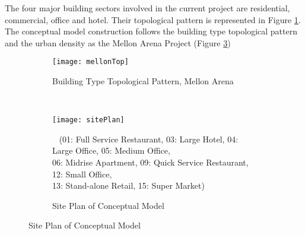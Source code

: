 \documentclass[hidelinks,12pt]{article}
\newcommand{\fref}[1]{Figure \ref{#1}}
\begin{document}
The four major building sectors involved in the current project are
residential, commercial, office and hotel. Their topological pattern
is represented in Figure \ref{fig:mellonTop}. The conceptual model
construction follows the building type topological pattern and the
urban density as the Mellon Arena Project (\fref{fig:sitePlan})
\begin{figure}[h!]
  \centering
  \begin{subfigure}
  \centering
  \texttt{[image: mellonTop]}
  \caption{Building Type Topological Pattern, Mellon Arena}
  \label{fig:mellonTop}
  \end{subfigure}
  ~
  \begin{subfigure}
  \centering
  \texttt{[image: sitePlan]}
  \caption{Site Plan of Conceptual Model}~ (01: Full Service
  Restaurant, 03: Large Hotel, 04: Large Office, 05: Medium Office,
  \\06: Midrise Apartment, 09: Quick Service Restaurant, 12: Small
  Office, \\13: Stand-alone Retail, 15: Super Market)
  \label{fig:sitePlan}
  \end{subfigure}
\end{figure}   
\end{document}
